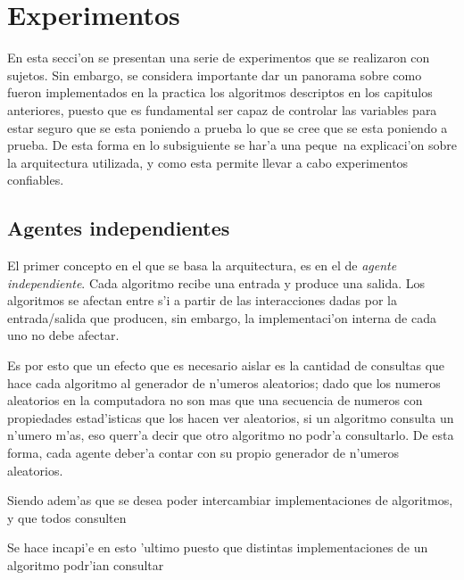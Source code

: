 \section{Experimentos}
En esta secci'on se presentan una serie de experimentos que se realizaron con sujetos. Sin embargo, se considera
importante dar un panorama sobre como fueron implementados en la practica los algoritmos descriptos en los capitulos
anteriores, puesto que es fundamental ser capaz de controlar las variables para estar seguro que se esta poniendo
a prueba lo que se cree que se esta poniendo a prueba. De esta forma en lo subsiguiente se har'a una peque~na 
explicaci'on sobre la arquitectura utilizada, y como esta permite llevar a cabo experimentos confiables.

\subsection{Agentes independientes}
El primer concepto en el que se basa la arquitectura, es en el de \emph{agente independiente}. 
Cada algoritmo recibe una entrada y produce una salida. Los algoritmos se afectan entre s'i a partir de las 
interacciones dadas por la entrada/salida que producen, sin embargo, la implementaci'on interna de cada uno
no debe afectar. 

Es por esto que un efecto que es necesario aislar es la cantidad de consultas que hace cada algoritmo al
generador de n'umeros aleatorios; dado que los numeros aleatorios en la computadora no son mas que una secuencia
de numeros con propiedades estad'isticas que los hacen ver aleatorios, si un algoritmo consulta un n'umero m'as,
eso querr'a decir que otro algoritmo no podr'a consultarlo. De esta forma, cada agente deber'a contar con su propio
generador de n'umeros aleatorios.

Siendo adem'as que se desea poder intercambiar implementaciones de algoritmos, y que todos consulten 

Se hace incapi'e en esto 'ultimo puesto que distintas implementaciones de un algoritmo
podr'ian consultar 
